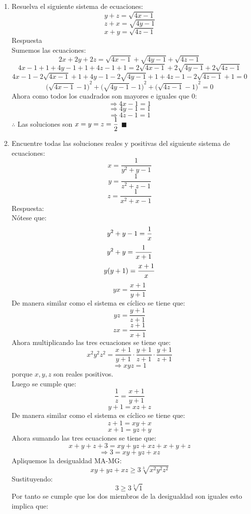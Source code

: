 \documentclass{book}
\begin{document}
\begin{enumerate}
Ahora supongamos que $x<3$:
$$\Rightarrow 6-x>3\Rightarrow \log_{3}(6-x)>1$$
Sustituyendo:
$$\frac{z}{\sqrt{z^2-2z+6}}>1$$
$$z^2>z^2-2z+6$$
$$3<z$$
$$\Rightarrow 6-z<3\Rightarrow \log_{3}(6-z)<1$$
Sustituyendo:
$$\frac{y}{\sqrt{y^2-2y+6}}<1$$
$$y^2<y^2-2y+6$$
$$3>y$$
$$6-y>3\Rightarrow\log_{3}(6-y)>1$$
Sustituyendo:
$$\frac{x}{\sqrt{x^2-2x+6}}>1$$
$$x^2>x^2-2x+6$$
$$3<x$$
Lo cual es una contradicción de lo que supusimos anteriormente. De aquí obtenemos que $x=3$.
$$\Rightarrow\frac{z}{\sqrt{z^2-2z+6}}=1$$
$$z^2=z^2-2z+6$$
$$3=z$$
$$\Rightarrow \frac{y}{\sqrt{y^2-2y+6}}=1$$
$$y^2=y^2-2y+6$$
$$3=y$$
$\therefore$ Las soluciones son: $x=y=z=3$ $\blacksquare$\\
				\item Resuelva el siguiente sistema de ecuaciones: 
				$$y+z=\sqrt{4x-1}$$
				$$z+x=\sqrt{4y-1}$$
				$$x+y=\sqrt{4z-1}$$
				Respuesta\\
				Sumemos las ecuaciones:
$$2x+2y+2z=\sqrt{4x-1}+\sqrt{4y-1}+\sqrt{4z-1}$$
$$4x-1+1+4y-1+1+4z-1+1=2\sqrt{4x-1}+2\sqrt{4y-1}+2\sqrt{4z-1}$$
$$4x-1-2\sqrt{4x-1}+1+4y-1-2\sqrt{4y-1}+1+4z-1-2\sqrt{4z-1}+1=0$$
$${\big(\sqrt{4x-1}-1\big)}^2+{\big(\sqrt{4y-1}-1\big)}^2+{\big(\sqrt{4z-1}-1\big)}^2=0$$
Ahora como todos los cuadrados son mayores e iguales que 0:
$$\Rightarrow 4x-1=1$$
$$\Rightarrow 4y-1=1$$
$$\Rightarrow 4z-1=1$$
$\therefore$ Las soluciones son $\displaystyle{x=y=z={1\over 2}}$ $\blacksquare$\\	
				\item Encuentre todas las soluciones reales y positivas del siguiente sistema de ecuaciones: 
				$$x=\frac{1}{y^2+y-1}$$
				$$y=\frac{1}{z^2+z-1}$$
				$$z=\frac{1}{x^2+x-1}$$
				Respuesta:\\
				Nótese que:
$$y^2+y-1={1\over x}$$
$$y^2+y={1\over x+1}$$
$$y(y+1)={x+1\over x}$$
$$yx=\frac{x+1}{y+1}$$
De manera similar como el sistema es cíclico se tiene que:
$$yz=\frac{y+1}{z+1}$$
$$zx=\frac{z+1}{x+1}$$
Ahora multiplicando las tres ecuaciones se tiene que:
$$x^2 y^2 z^2=\frac{x+1}{y+1}\cdot\frac{y+1}{z+1}\cdot\frac{y+1}{z+1}$$
$$\Rightarrow xyz=1$$
porque $x,y,z$ son reales positivos.\\
Luego se cumple que:
$$\frac{1}{z}=\frac{x+1}{y+1}$$
$$y+1=xz+z$$
De manera similar como el sistema es cíclico se tiene que:
$$z+1=xy+x$$
$$x+1=yz+y$$
Ahora sumando las tres ecuaciones se tiene que:
$$x+y+z+3=xy+yz+xz+x+y+z$$
$$\Rightarrow 3=xy+yz+xz$$
Apliquemos la desigualdad MA-MG:
$$xy+yz+xz\geq 3\sqrt[3]{x^2 y^2 z^2}$$
Sustituyendo:
$$3\geq 3\sqrt[3]{1}$$
Por tanto se cumple que los dos miembros de la desigualdad son iguales esto implica que:

\end{enumerate}
\end{document}
